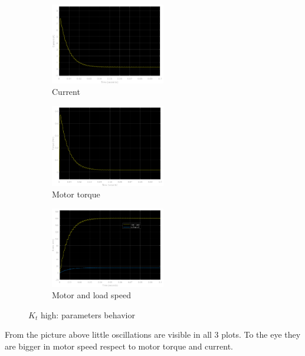 \documentclass[11pt,a4paper]{article}
\begin{document}
\begin{figure}[H]
	\begin{subfigure}[b]{0.3\textwidth}
		\includegraphics[width=50mm]{images/current1.png}
		\caption{Current}
	\end{subfigure}
	\hfill
	\begin{subfigure}[b]{0.3\textwidth}
		\includegraphics[width=50mm]{images/torque1.png}
		\caption{Motor torque}
	\end{subfigure}
	\hfill
	\begin{subfigure}[b]{0.3\textwidth}
		\includegraphics[width=50mm]{images/speed1.png}
		\caption{Motor and load speed}
	\end{subfigure}
	\caption{$K_t$ high: parameters behavior}
	\label{fig1}
\end{figure}
From the picture above little oscillations are visible in all 3 plots. To the eye they are bigger in motor speed respect to motor torque and current.

\newpage
\end{document}
